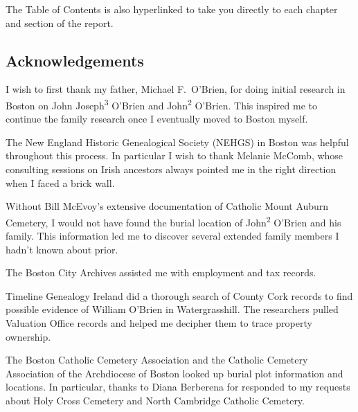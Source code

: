 The Table of Contents is also hyperlinked to take you directly to each chapter and section of the report.

\subsection{Acknowledgements}

I wish to first thank my father, Michael F.\ O'Brien, for doing initial research in Boston on John Joseph\textsuperscript{3} O'Brien and John\textsuperscript{2} O'Brien. This inspired me to continue the family research once I eventually moved to Boston myself.

The New England Historic Genealogical Society (NEHGS) in Boston was helpful throughout this process. In particular I wish to thank Melanie McComb, whose consulting sessions on Irish ancestors always pointed me in the right direction when I faced a brick wall.

Without Bill McEvoy's extensive documentation of Catholic Mount Auburn Cemetery, I would not have found the burial location of John\textsuperscript{2} O'Brien and his family. This information led me to discover several extended family members I hadn't known about prior.

The Boston City Archives assisted me with employment and tax records.

Timeline Genealogy Ireland did a thorough search of County Cork records to find possible evidence of William O'Brien in Watergrasshill. The researchers pulled Valuation Office records and helped me decipher them to trace property ownership.

The Boston Catholic Cemetery Association and the Catholic Cemetery Association of the Archdiocese of Boston looked up burial plot information and locations. In particular, thanks to Diana Berberena for responded to my requests about Holy Cross Cemetery and North Cambridge Catholic Cemetery.
